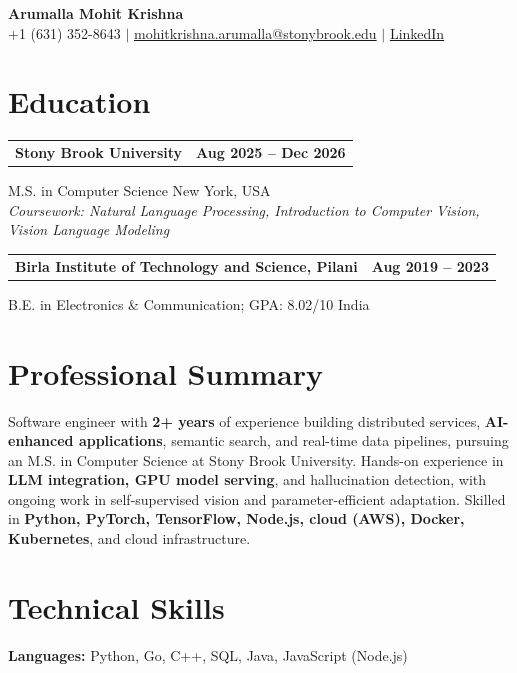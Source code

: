 \documentclass[letterpaper,10pt]{article}
\makeatletter
\newcommand{\entry}[2]{%
  \noindent
  \begin{tabularx}{\linewidth}
    {@{}>{\raggedright\arraybackslash}X@{\hspace{6pt}}r@{}}
    \textbf{#1} & #2
  \end{tabularx}\par
}
\makeatother
\begin{document}
\begin{center}
    {\LARGE\bfseries Arumalla Mohit Krishna}\\[3pt]
    +1 (631) 352-8643 $|$
    \href{mailto:mohitkrishna.arumalla@stonybrook.edu}
    {mohitkrishna.arumalla@stonybrook.edu} $|$
    \href{https://linkedin.com/in/mohit-krishna-arumalla}
    {LinkedIn}
\end{center}
\vspace{-8pt}

\section{Education}

\entry
  {\textbf{Stony Brook University}}
  {\textbf{Aug 2025 -- Dec 2026}}

M.S. in Computer Science \hfill New York, USA\\
\textit{
Coursework: Natural Language Processing,
Introduction to Computer Vision, Vision Language Modeling
}
\vspace{3pt}

\entry
  {\textbf{Birla Institute of Technology and Science, Pilani}}
  {\textbf{Aug 2019 -- 2023}}

B.E. in Electronics \& Communication; GPA: 8.02/10 \hfill India
\section{Professional Summary}

Software engineer with \textbf{2+ years} of experience building distributed services, \textbf{AI-enhanced applications}, semantic search, and real-time data pipelines, pursuing an M.S. in Computer Science at Stony Brook University. Hands-on experience in \textbf{LLM integration, GPU model serving}, and hallucination detection, with ongoing work in self-supervised vision and parameter-efficient adaptation. Skilled in \textbf{Python, PyTorch, TensorFlow, Node.js, cloud (AWS), Docker, Kubernetes}, and cloud infrastructure.

\section{Technical Skills}

\textbf{Languages:}
Python, Go, C++, SQL, Java, JavaScript (Node.js)\\
\end{document}
